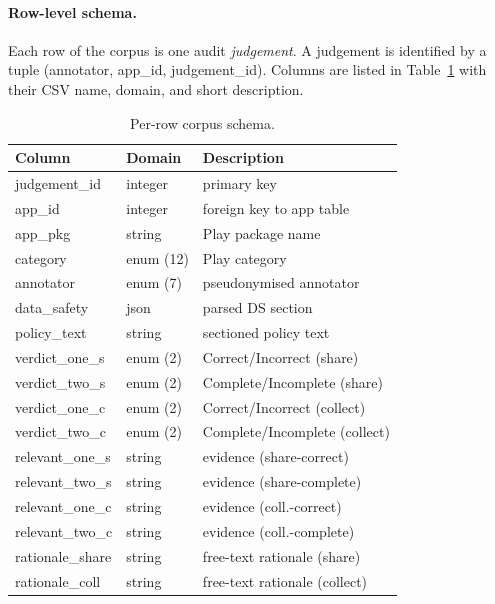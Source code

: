 \documentclass[11pt,a4paper]{article}
\newcommand{\dec}[1]{\textsf{#1}}
\begin{document}
\paragraph{Row-level schema.}
Each row of the corpus is one audit \emph{judgement}. A judgement is
identified by a tuple \dec{(annotator, app\_id, judgement\_id)}.
Columns are listed in Table~\ref{tab:schema} with their CSV name,
domain, and short description.

\begin{table}[t]
\centering\small
\caption{Per-row corpus schema.}
\label{tab:schema}
\begin{tabular}{lll}
\toprule
Column & Domain & Description \\
\midrule
\dec{judgement\_id}   & integer    & primary key \\
\dec{app\_id}         & integer    & foreign key to app table \\
\dec{app\_pkg}        & string     & Play package name \\
\dec{category}        & enum (12)  & Play category \\
\dec{annotator}       & enum (7)   & pseudonymised annotator \\
\dec{data\_safety}    & json       & parsed DS section \\
\dec{policy\_text}    & string     & sectioned policy text \\
\dec{verdict\_one\_s} & enum (2)   & Correct/Incorrect (share) \\
\dec{verdict\_two\_s} & enum (2)   & Complete/Incomplete (share) \\
\dec{verdict\_one\_c} & enum (2)   & Correct/Incorrect (collect) \\
\dec{verdict\_two\_c} & enum (2)   & Complete/Incomplete (collect) \\
\dec{relevant\_one\_s}& string     & evidence (share-correct) \\
\dec{relevant\_two\_s}& string     & evidence (share-complete) \\
\dec{relevant\_one\_c}& string     & evidence (coll.-correct) \\
\dec{relevant\_two\_c}& string     & evidence (coll.-complete) \\
\dec{rationale\_share}& string     & free-text rationale (share) \\
\dec{rationale\_coll} & string     & free-text rationale (collect) \\
\bottomrule
\end{tabular}
\end{table}
\end{document}

